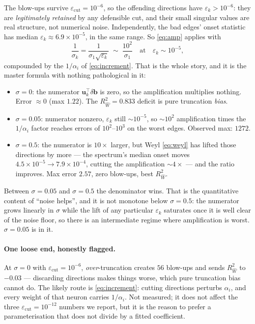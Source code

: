 \documentclass[11pt]{article}
\newcommand{\Mat}[1]{\mathbf{#1}}
\newcommand{\Rw}{R^2_{\widehat W}}
\newcommand{\eps}{\varepsilon}
\begin{document}
The blow-ups survive $\eps_{\mathrm{cut}} = 10^{-6}$, so the offending directions
have $\eps_k > 10^{-6}$: they are \emph{legitimately retained} by any defensible
cut, and their small singular values are real structure, not numerical noise.
Independently, the bad edges' onset statistic has median $\eps_k \approx
6.9\times10^{-5}$, in the same range. So \eqref{eq:amp} applies with
\begin{equation}
\frac{1}{\sigma_k} = \frac{1}{\sigma_1\sqrt{\eps_k}}
\;\sim\; \frac{10^{2}}{\sigma_1} \quad\text{at}\quad \eps_k \sim 10^{-5},
\label{eq:ampsize}
\end{equation}
compounded by the $1/\alpha_i$ of \eqref{eq:increment}. That is the whole story,
and it is the master formula with nothing pathological in it:
\begin{itemize}
\item $\sigma = 0$: the numerator $\Mat u_k^{\!\top}\delta\Mat b$ is zero, so the
      amplification multiplies nothing. Error $\approx 0$ (max $1.22$). The
      $\Rw = 0.833$ deficit is pure truncation \emph{bias}.
\item $\sigma = 0.05$: numerator nonzero, $\eps_k$ still $\sim10^{-5}$, so
      $\sim10^2$ amplification times the $1/\alpha_i$ factor reaches errors of
      $10^2$--$10^3$ on the worst edges. Observed max: $1272$.
\item $\sigma = 0.5$: the numerator is $10\times$ larger, but Weyl
      \eqref{eq:weyl} has lifted those directions by more --- the spectrum's
      median onset moves $4.5\times10^{-5} \to 7.9\times10^{-4}$, cutting the
      amplification $\sim4\times$ --- and the ratio improves. Max error $2.57$,
      zero blow-ups, best $\Rw$.
\end{itemize}
Between $\sigma = 0.05$ and $\sigma = 0.5$ the denominator wins. That is the
quantitative content of ``noise helps'', and it is not monotone below
$\sigma = 0.5$: the numerator grows linearly in $\sigma$ while the lift of any
particular $\eps_k$ saturates once it is well clear of the noise floor, so there
is an intermediate regime where amplification is worst. $\sigma = 0.05$ is in it.

\paragraph{One loose end, honestly flagged.} At $\sigma = 0$ with
$\eps_{\mathrm{cut}} = 10^{-6}$, \emph{over}-truncation creates $56$ blow-ups and
sends $\Rw$ to $-0.03$ --- discarding directions makes things worse, which pure
truncation bias cannot do. The likely route is \eqref{eq:increment}: cutting
directions perturbs $\alpha_i$, and every weight of that neuron carries
$1/\alpha_i$. Not measured; it does not affect the three
$\eps_{\mathrm{cut}}=10^{-12}$ numbers we report, but it is the reason to prefer
a parameterisation that does not divide by a fitted coefficient.
\end{document}
